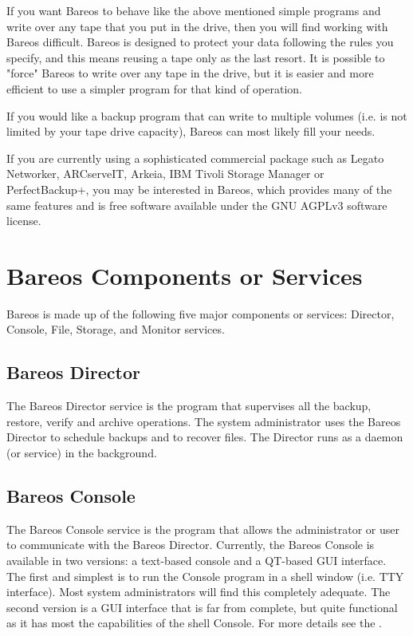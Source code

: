 If you want Bareos to behave like the above mentioned simple
programs and write over any tape that you put in the drive, then you will find
working with Bareos difficult. Bareos is designed to protect your data
following the rules you specify, and this means reusing a tape only
as the last resort. It is possible to "force" Bareos to write
over any tape in the drive, but it is easier and more efficient to use a
simpler program for that kind of operation.

If you would like a backup program that can write
to multiple volumes (i.e. is not limited by your tape drive capacity), Bareos
can most likely fill your needs.

If you are currently using a sophisticated commercial package such as Legato
Networker, ARCserveIT, Arkeia, IBM Tivoli Storage Manager or PerfectBackup+, you may be interested in
Bareos, which provides many of the same features and is free software
available under the GNU AGPLv3 software license.

\section{Bareos Components or Services}

Bareos is made up of the following five major components or services:
Director, Console, File, Storage, and Monitor services.


\subsection*{Bareos Director}
   \label{DirDef}
   The Bareos Director service is the program that supervises
   all the backup, restore, verify and archive operations.  The system
   administrator uses the Bareos Director to schedule backups and to
   recover files. The Director runs as a daemon
   (or service) in the background.
   \label{UADef}

\subsection*{Bareos Console}
   The Bareos Console service is the program that allows the
   administrator or user to communicate with the Bareos Director.
   Currently, the Bareos Console is available in two versions:
   a text-based console and a QT-based GUI interface.
   The first and simplest is to run the Console program in a shell window
   (i.e.  TTY interface).  Most system administrators will find this
   completely adequate.  The second version is a GUI interface that
   is far from complete, but quite functional as it has most the
   capabilities of the shell Console. For more
   details see the .

